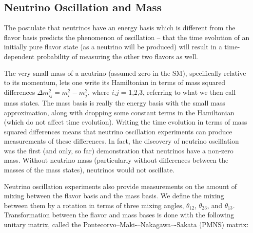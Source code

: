 \subsection{Neutrino Oscillation and Mass}

The postulate that neutrinos have an energy basis which is different from the flavor basis predicts the phenomenon of oscillation -- that the time evolution of an initially pure flavor state (as a neutrino will be produced) will result in a time-dependent probability of measuring the other two flavors as well.  

The very small mass of a neutrino (assumed zero in the SM), specifically relative to its momentum, lets one write its Hamiltonian in terms of mass squared differences $\Delta m_{ij}^{2} = m_{i}^{2} - m_{j}^{2}$, where $i$,$j$ = 1,2,3, referring to what we then call mass states.  The mass basis is really the energy basis with the small mass approximation, along with dropping some constant terms in the Hamiltonian (which do not affect time evolution).  Writing the time evolution in terms of mass squared differences means that neutrino oscillation experiments can produce measurements of these differences.  In fact, the discovery of neutrino oscillation was the first (and only, so far) demonstration that neutrinos have a non-zero mass.  Without neutrino mass (particularly without differences between the masses of the mass states), neutrinos would not oscillate.

Neutrino oscillation experiments also provide measurements on the amount of mixing between the flavor basis and the mass basis.  We define the mixing between them by a rotation in terms of three mixing angles, $\theta_{12}$, $\theta_{23}$, and $\theta_{13}$.  Transformation between the flavor and mass bases is done with the following unitary matrix, called the Pontecorvo--Maki-–Nakagawa–-Sakata (PMNS) matrix:

